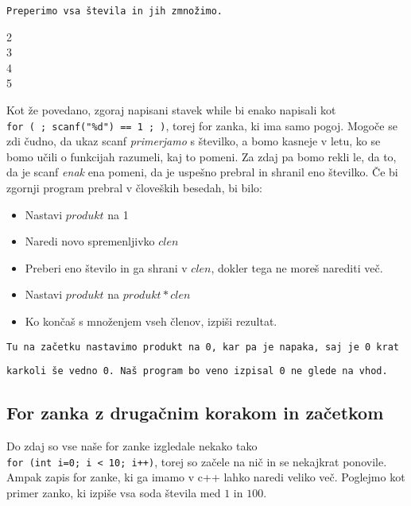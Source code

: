 \begin{examples}
\verb+Preperimo vsa števila in jih zmnožimo.+
	
	
\begin{inout}
	2  \\
	3 \\
	4 \\
	5
\end{inout}
	
\end{examples}

Kot že povedano, zgoraj napisani stavek while bi enako napisali kot
\texttt{for~(~;~scanf("\%d")~==~1~;~)}, torej for zanka, ki ima samo pogoj.
Mogoče se zdi čudno, da ukaz scanf \emph{primerjamo} s številko, a bomo kasneje
v letu, ko se bomo učili o funkcijah razumeli, kaj to pomeni. Za zdaj pa
bomo rekli le, da to, da je scanf \emph{enak} ena pomeni, da je uspešno prebral
in shranil eno številko. Če bi zgornji program prebral v človeških besedah, bi
bilo:
\begin{itemize}
	\item Nastavi $produkt$ na 1
	\item Naredi novo spremenljivko $clen$
	\item Preberi eno število in ga shrani v $clen$, dokler tega ne moreš
	narediti več.
	\item Nastavi $produkt$ na $produkt * clen$
	\item Ko končaš s množenjem vseh členov, izpiši rezultat.
\end{itemize}

\begin{errors}
\verb+Tu na začetku nastavimo produkt na 0, kar pa je napaka, saj je 0 krat+

\verb+karkoli še vedno 0. Naš program bo veno izpisal 0 ne glede na vhod.+


\end{errors}

\subsection{For zanka z drugačnim korakom in začetkom}

Do zdaj so vse naše for zanke izgledale nekako tako
\texttt{for~(int~i=0;~i~<~10;~i++)}, torej so začele na nič in se nekajkrat
ponovile. Ampak zapis for zanke, ki ga imamo v c++ lahko naredi veliko več.
Poglejmo kot primer zanko, ki izpiše vsa soda števila med $1$ in $100$.

